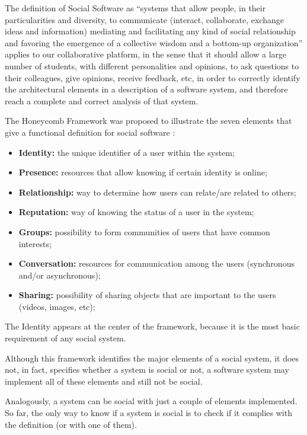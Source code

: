 The definition of Social Software as ``systems that allow people, in their particularities and diversity, to communicate (interact, collaborate, exchange ideas and information) mediating and facilitating any kind of social relationship and favoring the emergence of a collective wisdom and a bottom-up organization'' \cite{pereira2010social} applies to our collaborative platform, in the sense that it should allow a large number of students, with different personalities and opinions, to ask questions to their colleagues, give opinions, receive feedback, etc, in order to correctly identify the architectural elements in a description of a software system, and therefore reach a complete and correct analysis of that system. 

The Honeycomb Framework was proposed to illustrate the seven elements that give a functional definition for social software \cite{smith2007social}:
\begin{itemize}
\item \textbf{Identity:} the unique identifier of a user within the system;
\item \textbf{Presence:} resources that allow knowing if certain identity is online;
\item \textbf{Relationship:} way to determine how users can relate/are related to others;
\item \textbf{Reputation:} way of knowing the status of a user in the system;
\item \textbf{Groups:} possibility to form communities of users that have common interests;
\item \textbf{Conversation:} resources for communication among the users (synchronous and/or asynchronous);
\item \textbf{Sharing:} possibility of sharing objects that are important to the users (videos, images, etc);

\end{itemize}

The Identity appears at the center of the framework, because it is the most basic requirement of any social system.

Although this framework identifies the major elements of a social system, it does not, in fact, specifies whether a system is social or not, a software system may implement all of these elements and still not be social.

Analogously, a system can be social with just a couple of elements implemented. So far, the only way to know if a system is social is to check if it complies with the definition (or with one of them).

